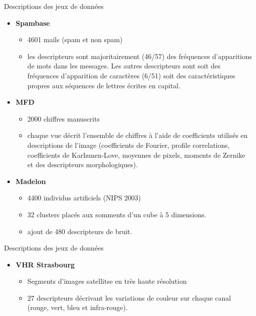 \documentclass[hyperref={pdfpagelabels=false}]{beamer}
\begin{document}
    \begin{frame}{Descriptions des jeux de données}
        \begin{itemize}
            \item \textbf{Spambase}
                \begin{itemize}
                    \item 4601 mails (spam et non spam)
                    \item les descripteurs sont majoritairement (46/57) des
                        fréquences d'apparitions de mots dans les messages. Les
                        autres descripteurs sont soit des fréquences
                        d'apparition de caractères (6/51) soit des
                        caractéristiques propres aux séquences de lettres
                        écrites en capital.
                \end{itemize}
            \item \textbf{MFD}
                \begin{itemize}
                    \item 2000 chiffres manuscrits
                    \item chaque vue décrit l'ensemble de chiffres à l'aide de
                        coefficients utilisés en descriptions de l'image
                        (coefficients de Fourier, profile correlations,
                        coefficients de Karhunen-Love, moyennes de pixels,
                    moments de Zernike et des descripteurs morphologiques).
                \end{itemize}
            \item \textbf{Madelon}
                \begin{itemize}
                    \item 4400 individus artificiels (NIPS 2003)
                    \item 32 clusters placés aux somments d'un cube à 5 dimensions.
                    \item ajout de 480 descripteurs de bruit.
                \end{itemize}
        \end{itemize}
    \end{frame}

    \begin{frame}{Descriptions des jeux de données}
        \begin{itemize}
            \item \textbf{VHR Strasbourg}
                    \begin{itemize}
                        \item Segments d'images satellitse en très haute résolution 
                        \item 27 descripteurs décrivant les variations de couleur
                            sur chaque canal (rouge, vert, bleu et infra-rouge).
                    \end{itemize}
        \end{itemize}
    \end{frame}
\end{document}
